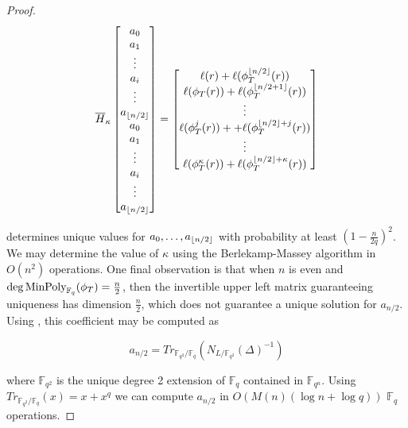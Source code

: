 \documentclass{jams-l}
\theoremstyle{remark}
\numberwithin{equation}{section}
\newcommand{\minpol}{\textnormal{MinPoly}_{\mathbb{F}_q}}
\DeclarePairedDelimiter\floor{\lfloor}{\rfloor}
\begin{document}
\begin{proof}
\[\overline{H}_{\kappa}\begin{bmatrix} a_0 \\ a_1 \\ \vdots \\ a_i \\ \vdots \\ a_{\floor*{n/2}} \\ a_0 \\ a_1 \\ \vdots \\ a_i \\ \vdots \\ a_{\floor*{n/2}} \end{bmatrix} = 
\begin{bmatrix} \ell(r) + \ell(\phi_T^{\floor*{n/2}}(r)) \\ \ell(\phi_T(r)) + \ell(\phi_T^{\floor*{n/2 + 1}}(r))  \\ \vdots \\ \ell(\phi_T^j(r)) + + \ell(\phi_T^{\floor*{n/2} + j}(r))  \\ \vdots  \\   \ell(\phi_T^{\kappa}(r)) + \ell(\phi_T^{\floor*{n/2} + \kappa}(r))  \end{bmatrix} \]

\noindent determines unique values for $a_0, \ldots, a_{\floor*{n/2}}$ with probability at least $(1 - \frac{n}{2q})^2$. We may determine the value of $\kappa$ using the Berlekamp-Massey algorithm in $O(n^2)$ operations. One final observation is that when $n$ is even and $\deg \minpol(\phi_T) = \frac{n}{2}$, then the invertible upper left matrix guaranteeing uniqueness has dimension $\frac{n}{2}$, which does not guarantee a unique solution for $a_{n/2}$. Using \cite[proposition 2.14]{frobdist}, this coefficient may be computed as

\[a_{n/2} = Tr_{\mathbb{F}_{q^2}/\mathbb{F}_{q}}(N_{L/\mathbb{F}_{q^2}}(\Delta)^{-1})\]

\noindent where $\mathbb{F}_{q^2}$ is the unique degree 2 extension of $\mathbb{F}_q$ contained in $\mathbb{F}_{q^n}$. Using $Tr_{\mathbb{F}_{q^2}/\mathbb{F}_{q}}(x) = x + x^q$ we can compute $a_{n/2}$ in $O(M(n)(\log n + \log q))$ $\mathbb{F}_q$ operations.





\end{proof}
\end{document}
